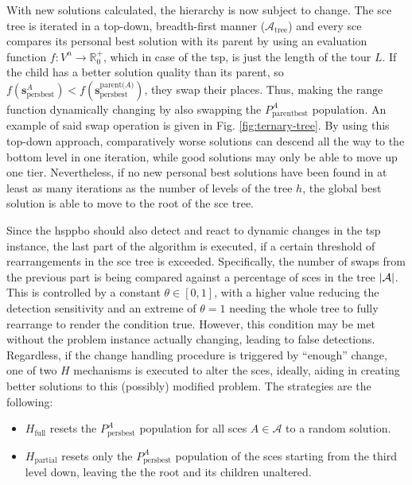 With new solutions calculated, the hierarchy is now subject to change. The \gls{sce} tree is iterated in a top-down, breadth-first manner ($\mathcal{A}_\text{tree}$) and every \gls{sce} compares its personal best solution with its parent by using an evaluation function $f : V^n \rightarrow \mathbb{R}_{0}^{+}$, which in case of the \gls{tsp}, is just the length of the tour $L$. If the child has a better solution quality than its parent, so $f(\mathbf{s}^A_{\text{persbest}}) < f(\mathbf{s}^{\text{parent($A$)}}_{\text{persbest}})$, they swap their places. Thus, making the $\text{range}$ function dynamically changing by also swapping the $P^{A}_{\text{parentbest}}$ population. An example of said swap operation is given in Fig. \ref{fig:ternary-tree}. By using this top-down approach, comparatively worse solutions can descend all the way to the bottom level in one iteration, while good solutions may only be able to move up one tier. Nevertheless, if no new personal best solutions have been found in at least as many iterations as the number of levels of the tree $h$, the global best solution is able to move to the root of the \gls{sce} tree.

Since the \gls{hsppbo} should also detect and react to dynamic changes in the \gls{tsp} instance, the last part of the algorithm is executed, if a certain threshold of rearrangements in the \gls{sce} tree is exceeded. Specifically, the number of swaps from the previous part is being compared against a percentage of \glspl{sce} in the tree $\left\lvert\mathcal{A}\right\rvert$. This is controlled by a constant $\theta \in [0,1]$, with a higher value reducing the detection sensitivity and an extreme of $\theta = 1$ needing the whole tree to fully rearrange to render the condition true. However, this condition may be met without the problem instance actually changing, leading to false detections. Regardless, if the change handling procedure is triggered by \enquote{enough} change, one of two $H$ mechanisms is executed to alter the \glspl{sce}, ideally, aiding in creating better solutions to this (possibly) modified problem. The strategies are the following:
\begin{itemize}
	\item $H_\text{full}$ resets the $P^{A}_{\text{persbest}}$ population for all \glspl{sce} $A \in \mathcal{A}$ to a random solution.
	\item $H_\text{partial}$ resets only the $P^{A}_{\text{persbest}}$ population of the \glspl{sce} starting from the third level down, leaving the the root and its children unaltered.
\end{itemize}

